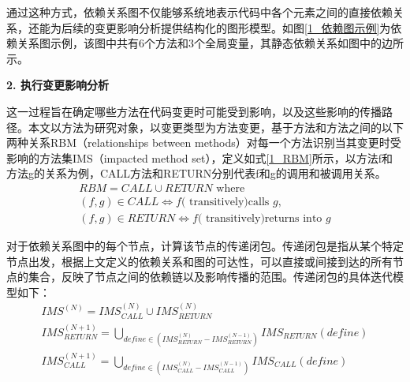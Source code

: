 通过这种方式，依赖关系图不仅能够系统地表示代码中各个元素之间的直接依赖关系，还能为后续的变更影响分析提供结构化的图形模型。如图\ref{1_依赖图示例}为依赖关系图示例，该图中共有6个方法和3个全局变量，其静态依赖关系如图中的边所示。


\noindent \textbf{2. 执行变更影响分析}

这一过程旨在确定哪些方法在代码变更时可能受到影响，以及这些影响的传播路径。本文以方法为研究对象，以变更类型为方法变更\cite{DZBZ202104016}，基于方法和方法之间的以下两种关系RBM（relationships between methods）对每一个方法识别当其变更时受影响的方法集IMS（impacted method set），定义如式\ref{1_RBM}所示，以方法f和方法g的关系为例，CALL方法和RETURN分别代表f和g的调用和被调用关系。
\begin{equation}
\begin{array}{l}
\label{1_RBM}
R B M=C A L L \cup R E T U R N \text { where } \\
(f, g) \in C A L L \Longleftrightarrow f(\text { transitively)calls } g, \\
(f, g) \in R E T U R N \Longleftrightarrow f(\text { transitively)returns into } g
\end{array}
\end{equation}

对于依赖关系图中的每个节点，计算该节点的传递闭包。传递闭包是指从某个特定节点出发，根据上文定义的依赖关系和图的可达性，可以直接或间接到达的所有节点的集合，反映了节点之间的依赖链以及影响传播的范围。传递闭包的具体迭代模型如下：
\begin{equation}
\begin{array}{l}
\label{1_IMS}
I M S^{(N)}=I M S_{C A L L}^{(N)} \cup I M S_{R E T U R N}^{(N)} \\
I M S_{ RETURN }^{(N+1)}=\bigcup_{define \in (I M S_{R E T U R N}^{(N)}-I M S_{R E T U R N}^{(N-1)} ) } I M S_{RETURN}({ define }) \\
I M S_{C A L L}^{(N+1)}=\bigcup_{ define  \in (I M S_{C A L L}^{(N)}-I M S_{C A L L}^{(N-1)})} I M S_{CALL}( { define })
\end{array}
\end{equation}


